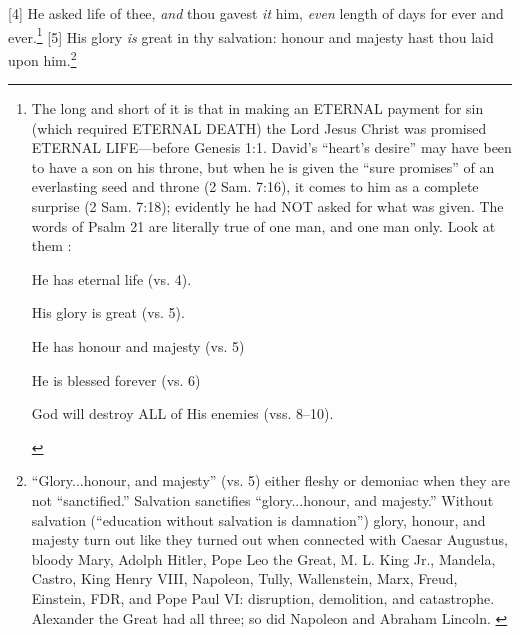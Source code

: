 [4] \textcolor[rgb]{0.00,0.00,1.00}{He asked life of thee, \emph{and} thou gavest \emph{it} him, \emph{even} length of days for ever and ever.}\footnote{The long and short of it is that in making an ETERNAL payment for sin (which required ETERNAL DEATH) the Lord Jesus Christ was promised ETERNAL LIFE—before Genesis 1:1. David’s “heart’s desire” may have been to have a son on his throne, but when he is given the “sure promises” of an everlasting seed and throne (2 Sam. 7:16), it comes to him as a complete surprise (2 Sam. 7:18); evidently he had NOT asked for what was given. The words of Psalm 21 are literally true of one man, and one man only. Look at them  \cite{Ruckman1992Psalms}:
\begin{compactenum}
    \item He has eternal life (vs. 4).
    \item His glory is great (vs. 5).
    \item He has honour and majesty (vs. 5)
    \item He is blessed forever (vs. 6)
    \item God will destroy ALL of His enemies (vss. 8–10).
\end{compactenum}}
[5] \textcolor[rgb]{0.00,0.00,1.00}{His glory \emph{is} great in thy salvation: honour and majesty hast thou laid upon him.}\footnote{“Glory...honour, and majesty” (vs. 5)  either fleshy or demoniac when they are not “sanctified.” Salvation sanctifies “glory...honour, and majesty.” Without salvation (“education without salvation is damnation”) glory, honour, and majesty turn out like they turned out when connected with Caesar Augustus, bloody Mary, Adolph Hitler, Pope Leo the Great, M. L. King Jr., Mandela, Castro, King Henry VIII, Napoleon, Tully, Wallenstein, Marx, Freud, Einstein, FDR, and Pope Paul VI: disruption, demolition, and catastrophe. Alexander the Great had all three; so did Napoleon and Abraham Lincoln. \cite{Ruckman1992Psalms}}

